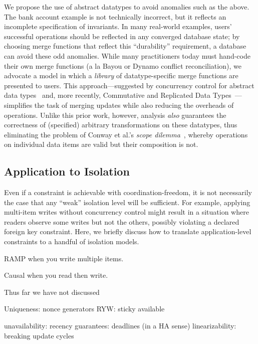 We propose the use of abstract datatypes to avoid anomalies such as
the above. The bank account example is not technically incorrect, but
it reflects an incomplete specification of invariants. In many
real-world examples, users' successful operations should be reflected
in any converged database state; by choosing merge functions that
reflect this ``durability'' requirement, a database can avoid these
odd anomalies. While many practitioners today must hand-code their own
merge functions (a la Bayou or Dynamo conflict reconciliation), we
advocate a model in which a \textit{library} of datatype-specific
merge functions are presented to users. This approach---suggested by
concurrency control for abstract data types~\cite{weihl-thesis} and,
more recently, Commutative and Replicated Data
Types~\cite{crdt}---simplifies the task of merging updates while also
reducing the overheads of operations. Unlike this prior work, however,
\iconfluence analysis \textit{also} guarantees the correctness of
(specified) arbitrary transformations on these datatypes, thus
eliminating the problem of Conway et al.'s \textit{scope
  dilemma}~\cite{blooml}, whereby operations on individual data items
are valid but their composition is not.

\subsection{Application to Isolation}

Even if a constraint is achievable with coordination-freedom, it is
not necessarily the case that any ``weak'' isolation level will be
sufficient. For example, applying multi-item writes without
concurrency control might result in a situation where readers observe
some writes but not the others, possibly violating a declared foreign
key constraint. Here, we briefly discuss how to translate
application-level constraints to a handful of isolation models.


RAMP when you write multiple items.

Causal when you read then write.


 Thus far we have not discussed

Uniqueness: nonce generators
RYW: sticky available

unavailability:
recency guarantees: deadlines (in a HA sense)
linearizability: breaking update cycles

